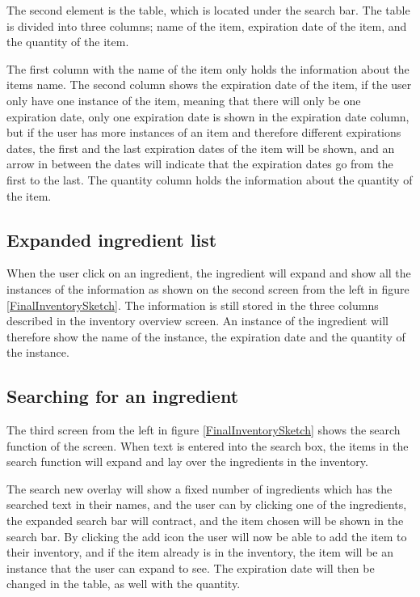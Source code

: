 The second element is the table, which is located under the search bar. The table is divided into three columns; name of the item, expiration date of the item, and the quantity of the item.

The first column with the name of the item only holds the information about the items name. The second column shows the expiration date of the item, if the user only have one instance of the item, meaning that there will only be one expiration date, only one expiration date is shown in the expiration date column, but if the user has more instances of an item and therefore different expirations dates, the first and the last expiration dates of the item will be shown, and an arrow in between the dates will indicate that the expiration dates go from the first to the last. The quantity column holds the information about the quantity of the item.

\subsection{Expanded ingredient list}

When the user click on an ingredient, the ingredient will expand and show all the instances of the information as shown on the second screen from the left in figure \ref{FinalInventorySketch}. The information is still stored in the three columns described in the inventory overview screen. An instance of the ingredient will therefore show the name of the instance, the expiration date and the quantity of the instance. 

\subsection{Searching for an ingredient}

The third screen from the left in figure \ref{FinalInventorySketch} shows the search function of the screen. When text is entered into the search box, the items in the search function will expand and lay over the ingredients in the inventory.

The search new overlay will show a fixed number of ingredients which has the searched text in their names, and the user can by clicking one of the ingredients, the expanded search bar will contract, and the item chosen will be shown in the search bar. By clicking the add icon the user will now be able to add the item to their inventory, and if the item already is in the inventory, the item will be an instance that the user can expand to see. The expiration date will then be changed in the table, as well with the quantity.